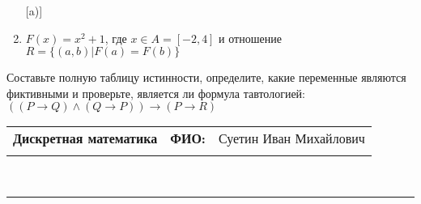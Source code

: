 \documentclass[10pt]{exam}
\newcommand{\class}{Дискретная математика}
\newcommand{\examdate}{}
\begin{document}
\begin{questions}
\begin{enumerate} [a)]
\item $F(x)=x^{2}+1$, где $x \in A = [-2, 4]$ и отношение $R = \{(a,b)|F(a) = F(b)\}$
\end{enumerate}\question Составьте полную таблицу истинности, определите, какие переменные являются фиктивными и проверьте, является ли формула тавтологией:
$(( P \rightarrow Q) \land (Q \rightarrow P)) \rightarrow (P \rightarrow R)$

\end{questions}
\newpage
\begin{flushright}
\begin{tabular}{p{2.8in} r l}
\textbf{\class} & \textbf{ФИО:} &Суетин Иван Михайлович
\\

\textbf{\examdate} &&\\
\end{tabular}\\
\end{flushright}
\rule[1ex]{\textwidth}{.1pt}
\end{document}
